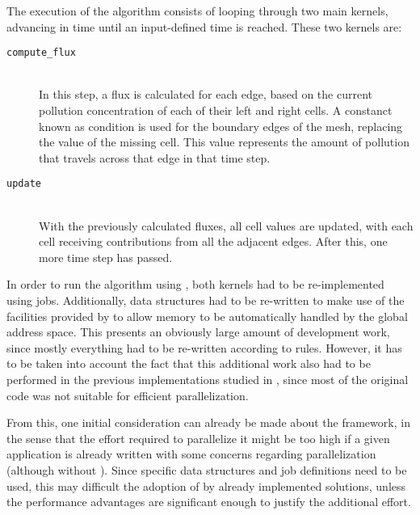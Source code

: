 \documentclass[main.tex]{subfiles}
\begin{document}
The execution of the algorithm consists of looping through two main kernels, advancing in time until an input-defined time is reached. These two kernels are:
\begin{description}
\item[\texttt{compute\_flux}] \hfill \\
  In this step, a flux is calculated for each edge, based on the current pollution concentration of each of their left and right cells. A constanct known as  condition is used for the boundary edges of the mesh, replacing the value of the missing cell. This value represents the amount of pollution that travels across that edge in that time step.

\item[\texttt{update}] \hfill \\
  With the previously calculated fluxes, all cell values are updated, with each cell receiving contributions from all the adjacent edges. After this, one more time step has passed.
\end{description}


In order to run the algorithm using \gama, both kernels had to be re-implemented using \gama jobs. Additionally, data structures had to be re-written to make use of the facilities provided by \gama to allow memory to be automatically handled by the global address space.
This presents an obviously large amount of development work, since mostly everything had to be re-written according to \gama rules. However, it has to be taken into account the fact that this additional work also had to be performed in the previous implementations studied in \cite{naps2012}, since most of the original code was not suitable for efficient parallelization.

From this, one initial consideration can already be made about the framework, in the sense that the effort required to parallelize it might be too high if a given application is already written with some concerns regarding parallelization (although without \gama). Since specific data structures and job definitions need to be used, this may difficult the adoption of \gama by already implemented solutions, unless the performance advantages are significant enough to justify the additional effort.


\end{document}
